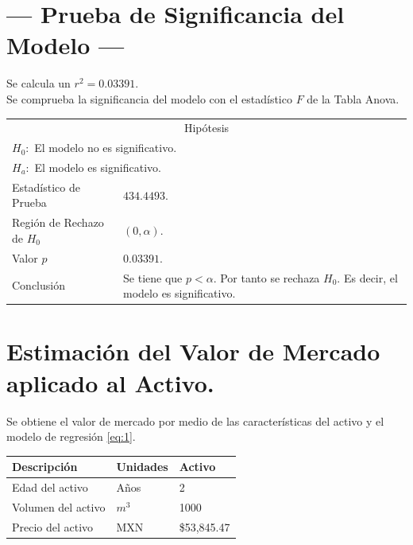 \documentclass{article}
\begin{document}
\section{\centering --- Prueba de Significancia del Modelo ---} %
Se calcula un \(r ^ 2 = 0.03391\). \\ 
Se comprueba la significancia del modelo con el estadístico \(F\) de la Tabla Anova.
\begin{center}
  \begin{tabular}{|l|p{6cm}|}
    \cline{1-2}
    \multicolumn{2}{|c|}{Hipótesis}\\ \cline{1-2}
    \multicolumn{2}{|l|}{\(H_0:\) El modelo no es significativo.} \\ 
    \multicolumn{2}{|l|}{\(H_a:\) El modelo es significativo.} \\ \cline{1-2}
    Estadístico de Prueba & \(434.4493\).\\ \cline{1-2} 
		Región de Rechazo de \(H_0\) & \((0, \alpha )\).\\ \cline{1-2} 
    Valor \(p\) & \(0.03391\).\\ \cline{1-2} 
    Conclusión & Se tiene que \(p<\alpha\). \newline 
		Por tanto se rechaza \(H_0\). \newline 
		Es decir, el modelo es significativo.\\ \cline{1-2} 
  \end{tabular}
\end{center} 

\section{\centering Estimación del Valor de Mercado aplicado al Activo.} %
Se obtiene el valor de mercado por medio de las características del activo y el modelo de regresión \eqref{eq:1}.
\begin{center}
  \begin{tabular}{|l|l|l|}
    \hline 
		Descripción   & Unidades  & Activo \\ \hline 
    Edad del activo    & Años      & 2      \\ \hline 
		Volumen del activo & \(m ^ 3\) & 1000   \\ \hline 
		Precio del activo   & MXN       & \$53,845.47 \\ \hline 
  \end{tabular}
\end{center} 
\end{document}
